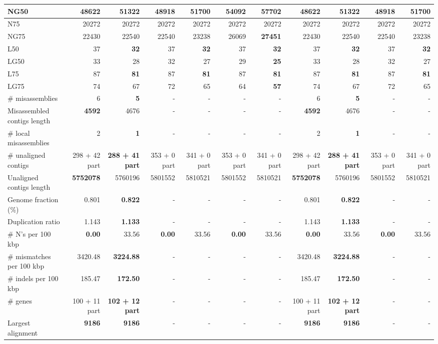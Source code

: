 \documentclass[12pt,a4paper]{article}
\begin{document}
\begin{table}[ht]
\begin{center}
\begin{tabular}{|l*{10}{|r}|}
NG50 & 48622 & 51322 & 48918 & 51700 & 54092 & {\bf 57702} & 48622 & 51322 & 48918 & 51700 \\ \hline
N75 & 20272 & 20272 & 20272 & 20272 & 20272 & 20272 & 20272 & 20272 & 20272 & 20272 \\ \hline
NG75 & 22430 & 22540 & 22540 & 23238 & 26069 & {\bf 27451} & 22430 & 22540 & 22540 & 23238 \\ \hline
L50 & 37 & {\bf 32} & 37 & {\bf 32} & 37 & {\bf 32} & 37 & {\bf 32} & 37 & {\bf 32} \\ \hline
LG50 & 33 & 28 & 32 & 27 & 29 & {\bf 25} & 33 & 28 & 32 & 27 \\ \hline
L75 & 87 & {\bf 81} & 87 & {\bf 81} & 87 & {\bf 81} & 87 & {\bf 81} & 87 & {\bf 81} \\ \hline
LG75 & 74 & 67 & 72 & 65 & 64 & {\bf 57} & 74 & 67 & 72 & 65 \\ \hline
\# misassemblies & 6 & {\bf 5} & - & - & - & - & 6 & {\bf 5} & - & - \\ \hline
Misassembled contigs length & {\bf 4592} & 4676 & - & - & - & - & {\bf 4592} & 4676 & - & - \\ \hline
\# local misassemblies & 2 & {\bf 1} & - & - & - & - & 2 & {\bf 1} & - & - \\ \hline
\# unaligned contigs & 298 + 42 part & {\bf 288 + 41 part} & 353 + 0 part & 341 + 0 part & 353 + 0 part & 341 + 0 part & 298 + 42 part & {\bf 288 + 41 part} & 353 + 0 part & 341 + 0 part \\ \hline
Unaligned contigs length & {\bf 5752078} & 5760196 & 5801552 & 5810521 & 5801552 & 5810521 & {\bf 5752078} & 5760196 & 5801552 & 5810521 \\ \hline
Genome fraction (\%) & 0.801 & {\bf 0.822} & - & - & - & - & 0.801 & {\bf 0.822} & - & - \\ \hline
Duplication ratio & 1.143 & {\bf 1.133} & - & - & - & - & 1.143 & {\bf 1.133} & - & - \\ \hline
\# N's per 100 kbp & {\bf 0.00} & 33.56 & {\bf 0.00} & 33.56 & {\bf 0.00} & 33.56 & {\bf 0.00} & 33.56 & {\bf 0.00} & 33.56 \\ \hline
\# mismatches per 100 kbp & 3420.48 & {\bf 3224.88} & - & - & - & - & 3420.48 & {\bf 3224.88} & - & - \\ \hline
\# indels per 100 kbp & 185.47 & {\bf 172.50} & - & - & - & - & 185.47 & {\bf 172.50} & - & - \\ \hline
\# genes & 100 + 11 part & {\bf 102 + 12 part} & - & - & - & - & 100 + 11 part & {\bf 102 + 12 part} & - & - \\ \hline
Largest alignment & {\bf 9186} & {\bf 9186} & - & - & - & - & {\bf 9186} & {\bf 9186} & - & - \\ \hline
\end{tabular}
\end{center}
\end{table}
\end{document}

